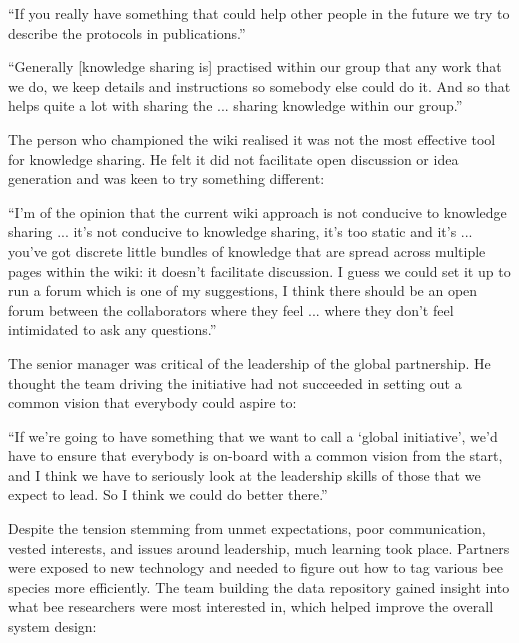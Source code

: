 \begin{displayquote}[Participant 9/3]
\small
\enquote{If you really have something that could help other people in the future we try to describe the protocols in publications.} 
\end{displayquote}

\begin{displayquote}[Participant 41/3]
\small
\enquote{Generally [knowledge sharing is] practised within our group that any work that we do, we keep details and instructions so somebody else could do it. And so that helps quite a lot with sharing the ... sharing knowledge within our group.} 
\end{displayquote}

The person who championed the wiki realised it was not the most effective tool for knowledge sharing. He felt it did not facilitate open discussion or idea generation and was keen to try something different:

\begin{displayquote}[Participant 41/3]
\small
\enquote{I'm of the opinion that the current wiki approach is not conducive to knowledge sharing ... it's not conducive to knowledge sharing, it’s too static and it's ... you've got discrete little bundles of knowledge that are spread across multiple pages within the wiki: it doesn't facilitate discussion. I guess we could set it up to run a forum which is one of my suggestions, I think there should be an open forum between the collaborators where they feel ... where they don't feel intimidated to ask any questions.} 
\end{displayquote}

The senior manager was critical of the leadership of the global partnership. He thought the team driving the initiative had not succeeded in setting out a common vision that everybody could aspire to:

\begin{displayquote}[Participant 22/3]
\small
\enquote{If we're going to have something that we want to call a \enquote{global initiative}, we'd have to ensure that everybody is on-board with a common vision from the start, and I think we have to seriously look at the leadership skills of those that we expect to lead. So I think we could do better there.} 
\end{displayquote}

Despite the tension stemming from unmet expectations, poor communication, vested interests, and issues around leadership, much learning took place. Partners were exposed to new technology and needed to figure out how to tag various bee species more efficiently. The team building the data repository gained insight into what bee researchers were most interested in, which helped improve the overall system design:

